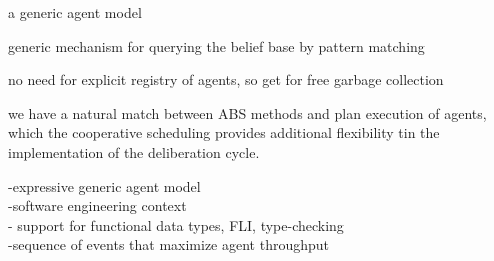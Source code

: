 a generic agent model

generic mechanism for querying the belief base by pattern matching 

no need for explicit registry of agents, so get for free garbage collection

we have a natural match between ABS methods and plan execution of agents, which the cooperative scheduling provides additional flexibility tin the implementation of the deliberation cycle.


-expressive generic agent model \\
-software engineering context \\
- support for functional data types, FLI, type-checking\\
-sequence of events that maximize agent throughput\\


